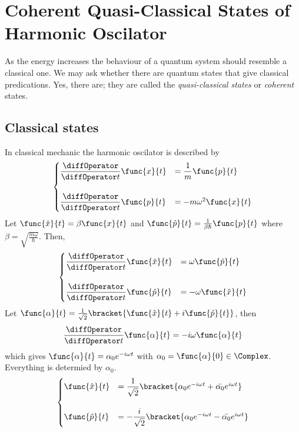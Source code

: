 \chapter{Coherent Quasi-Classical States of Harmonic Oscilator}
As the energy increases the behaviour of a quantum system should resemble a classical one. We may ask whether there are quantum states that give classical predications. Yes, there are; they are called the \textit{quasi-classical states} or \textit{coherent} states.
\section{Classical states}
In classical mechanic the harmonic oscilator is described by 
\begin{equation*}
    \begin{cases}
        \dfrac{\diffOperator}{\diffOperator t} \func{x}{t} &= \dfrac{1}{m} \func{p}{t}\\
        & \\
        \dfrac{\diffOperator}{\diffOperator t} \func{p}{t} &= -m\omega^2 \func{x}{t}
    \end{cases}
\end{equation*}
Let \(\func{\hat{x}}{t} = \beta \func{x}{t}\) and \(\func{\hat{p}}{t} = \frac{1}{\beta \hbar} \func{p}{t}\) where \(\beta = \sqrt{\frac{m\omega}{\hbar}}\). Then,
\begin{equation*}
    \begin{cases}
        \dfrac{\diffOperator}{\diffOperator t} \func{\hat{x}}{t} &= \omega \func{\hat{p}}{t}\\
        & \\
        \dfrac{\diffOperator}{\diffOperator t} \func{\hat{p}}{t} &= -\omega \func{\hat{x}}{t}
    \end{cases}
\end{equation*}
Let \(\func{\alpha}{t} = \frac{1}{\sqrt{2}} \bracket{\func{\hat{x}}{t} + i \func{\hat{p}}{t}}\), then 
\begin{equation*}
        \dfrac{\diffOperator}{\diffOperator t} \func{\alpha}{t} = -i\omega \func{\alpha}{t}
\end{equation*}
which gives \(\func{\alpha}{t} = \alpha_0 e^{-i\omega t}\) with \(\alpha_0 =\func{\alpha}{0} \in \Complex\). Everything is determied by \(\alpha_0\).
\begin{equation*}
    \begin{cases}
        \func{\hat{x}}{t} &= \dfrac{1}{\sqrt{2}} \bracket{\alpha_0 e^{-i\omega t} + \bar{\alpha_0} e^{i\omega t}}\\
        & \\
        \func{\hat{p}}{t} &= -\dfrac{i}{\sqrt{2}} \bracket{\alpha_0 e^{-i\omega t} - \bar{\alpha_0} e^{i\omega t}}
    \end{cases}
\end{equation*}

